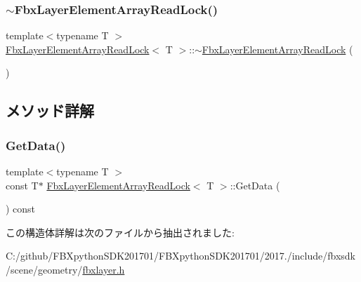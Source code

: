 \mbox{\label{struct_fbx_layer_element_array_read_lock_ab1e67ef56df73649cc41c66f88b29116}} 
\subsubsection{\texorpdfstring{$\sim$\+Fbx\+Layer\+Element\+Array\+Read\+Lock()}{~FbxLayerElementArrayReadLock()}}
{\footnotesize\ttfamily template$<$typename T $>$ \\
\hyperlink{struct_fbx_layer_element_array_read_lock}{Fbx\+Layer\+Element\+Array\+Read\+Lock}$<$ T $>$\+::$\sim$\hyperlink{struct_fbx_layer_element_array_read_lock}{Fbx\+Layer\+Element\+Array\+Read\+Lock} (\begin{DoxyParamCaption}{ }\end{DoxyParamCaption})}



\subsection{メソッド詳解}
\mbox{\label{struct_fbx_layer_element_array_read_lock_aad710280b9db22c282672ab5d193169d}} 
\subsubsection{\texorpdfstring{Get\+Data()}{GetData()}}
{\footnotesize\ttfamily template$<$typename T $>$ \\
const T$\ast$ \hyperlink{struct_fbx_layer_element_array_read_lock}{Fbx\+Layer\+Element\+Array\+Read\+Lock}$<$ T $>$\+::Get\+Data (\begin{DoxyParamCaption}{ }\end{DoxyParamCaption}) const}



この構造体詳解は次のファイルから抽出されました\+:\begin{DoxyCompactItemize}
\item 
C\+:/github/\+F\+B\+Xpython\+S\+D\+K201701/\+F\+B\+Xpython\+S\+D\+K201701/2017./include/fbxsdk/scene/geometry/\hyperlink{fbxlayer_8h}{fbxlayer.\+h}\end{DoxyCompactItemize}
